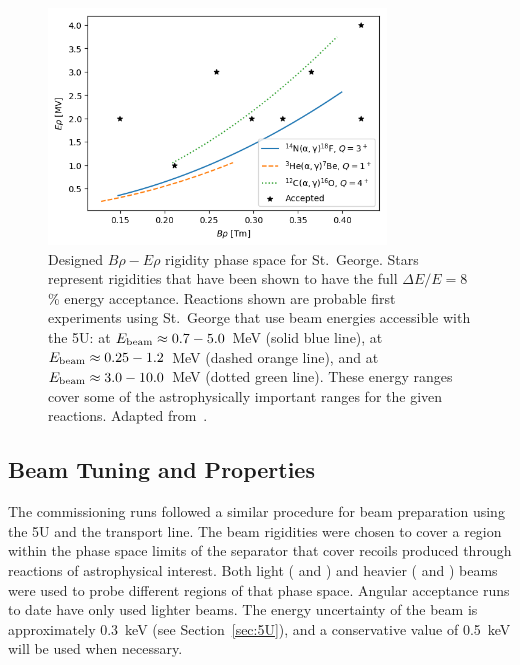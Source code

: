 \begin{figure}[t]
   \begin{center}
       \centerline{\includegraphics[width=0.8\textwidth]
           {figures/rigidity_phase_space.png}}
       \caption[Designed $B\rho-E\rho$ rigidity phase space for St.\ George]{
           Designed $B\rho-E\rho$ rigidity phase space for St.\ George. Stars
           represent rigidities that have been shown to have the full
           $\Delta E/E = 8$\,\% energy acceptance. Reactions shown are probable
           first experiments using St.\ George that use beam energies
           accessible with the 5U:
            at $E_{\rm{beam}}\approx 0.7-5.0$~MeV (solid blue line),
            at $E_{\rm{beam}}\approx 0.25-1.2$~MeV (dashed orange
           line), and
            at $E_{\rm{beam}}\approx 3.0-10.0$~MeV (dotted green
           line). These energy
           ranges cover some of the astrophysically important ranges for the
           given reactions.
           Adapted from~\cite{Meisel2017}.}
       \label{fig:rigidity_phase_space}
   \end{center}
\end{figure}


\subsection{Beam Tuning and Properties}
\label{sec:tuning}

The commissioning runs followed a similar procedure for beam preparation using
the 5U and the transport line. The beam rigidities were chosen to cover a
region within the phase space limits of the separator that cover recoils
produced through reactions of astrophysical interest. Both light (
and ) and heavier ( and ) beams were used to
probe different regions of that phase space. Angular acceptance runs to date
have only used lighter beams. The energy uncertainty of the beam is
approximately 0.3~keV (see Section~\ref{sec:5U}), and a conservative value of
0.5~keV will be used when necessary.

